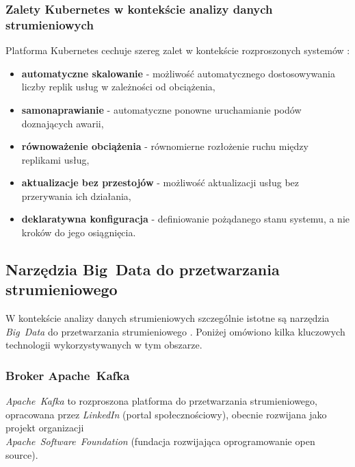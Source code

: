 \subsubsection{Zalety Kubernetes w kontekście analizy danych strumieniowych}
\label{subsubsec:zalety_kubernetes}

Platforma Kubernetes cechuje szereg zalet w kontekście rozproszonych systemów \cite{kubernetes_benefits}:

\begin{itemize}
    \item \textbf{automatyczne skalowanie} - możliwość automatycznego dostosowywania liczby replik usług w zależności od obciążenia,
    \item \textbf{samonaprawianie} - automatyczne ponowne uruchamianie podów doznających awarii,
    \item \textbf{równoważenie obciążenia} - równomierne rozłożenie ruchu między replikami usług,
    \item \textbf{aktualizacje bez przestojów} - możliwość aktualizacji usług bez przerywania ich działania,
    \item \textbf{deklaratywna konfiguracja} - definiowanie pożądanego stanu systemu, a nie kroków do jego osiągnięcia.
\end{itemize}

\subsection{Narzędzia \mbox{Big Data} do przetwarzania strumieniowego}
\label{subsec:narzedzia_big_data}

W kontekście analizy danych strumieniowych szczególnie istotne są narzędzia \mbox{\textit{Big Data}} do przetwarzania strumieniowego \cite{spark_streaming}.
Poniżej omówiono kilka kluczowych technologii wykorzystywanych w tym obszarze.

\subsubsection{Broker \mbox{Apache Kafka}}
\label{subsubsec:apache_kafka}

\mbox{\textit{Apache Kafka}} \cite{kafka} to rozproszona platforma do przetwarzania strumieniowego, opracowana przez \textit{LinkedIn} (portal społecznościowy), obecnie rozwijana jako projekt
organizacji \\ \mbox{\textit{Apache Software Foundation}} (fundacja rozwijająca oprogramowanie open source). 

